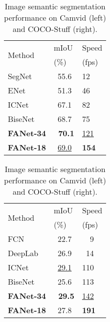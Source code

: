 \begin{table}[!t]
\begin{minipage}[!t]{0.46\columnwidth}
\centering
\renewcommand\arraystretch{0.95}
\begin{tabular}{p{1.5cm}p{0.6cm}p{0.6cm}} 
\toprule
 \multirow{2}{*}{{Method}} & {mIoU} &{Speed}\\ 
   & {(\%)} &{(fps)}\\ 
 \midrule 
 {SegNet~\cite{badrinarayanan2017segnet}}    &~{55.6}              &{12}\\ 
 {ENet~\cite{paszke2016enet}}                &~{51.3}              &{46}\\ 
 {ICNet~\cite{zhao2018icnet}}                &~{67.1}              &{82}\\ 
 {BiseNet~\cite{yu2018bisenet}}              &~{68.7}              &{75}\\ 
\midrule 
 {\textbf{FANet-34}}         &\textbf{~{70.1}}             &\underline{{121}}\\ 
 {\textbf{FANet-18}}         &~\underline{{69.0}}          &\textbf{{154}}\\ 
\bottomrule
\end{tabular}
\vspace{0mm}
\end{minipage}
\hspace{0.5cm}
\begin{minipage}[!t]{0.46\columnwidth}
\centering
\renewcommand\arraystretch{0.95}
\begin{tabular}{p{1.5cm}p{0.6cm}p{0.6cm}} 
\toprule
 \multirow{2}{*}{{Method}} & {mIoU} &{Speed}\\ 
   &{(\%)} &{(fps)}\\ 
 \midrule 
 {FCN~\cite{long2015fully}}               &~{22.7}              &{~~9}\\ 
 {DeepLab~\cite{chen2017deeplab}}         &~{26.9}              &{~14}\\ 
 {ICNet~\cite{zhao2018icnet}}             &~\underline{{29.1}}              &{110}\\
 {BiseNet~\cite{yu2018bisenet}}           &~{25.6}              &{113}\\ 
\midrule 
 {\textbf{FANet-34}}                     &\textbf{~{29.5}}     &\underline{{142}}\\
 {\textbf{FANet-18}}                     &~{27.8}              &\textbf{{191}}\\ 
\bottomrule
\end{tabular}
\vspace{0mm}
\end{minipage}
\vspace{-0.1cm}
\caption{\small{Image semantic segmentation performance on Camvid (left) and COCO-Stuff (right).}}
\vspace{-0.7cm}
\label{tab:coco}
\end{table}


